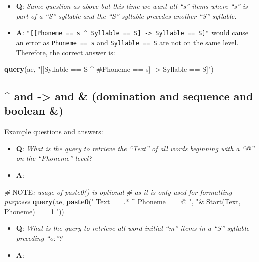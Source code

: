 \documentclass[]{book}
\newenvironment{Shaded}{\begin{snugshade}}{\end{snugshade}}
\newcommand{\AlertTok}[1]{\textcolor[rgb]{0.94,0.16,0.16}{#1}}
\newcommand{\CommentTok}[1]{\textcolor[rgb]{0.56,0.35,0.01}{\textit{#1}}}
\newcommand{\KeywordTok}[1]{\textcolor[rgb]{0.13,0.29,0.53}{\textbf{#1}}}
\newcommand{\NormalTok}[1]{#1}
\newcommand{\StringTok}[1]{\textcolor[rgb]{0.31,0.60,0.02}{#1}}
\providecommand{\tightlist}{%
  \setlength{\itemsep}{0pt}\setlength{\parskip}{0pt}}
\theoremstyle{definition}
\theoremstyle{definition}
\theoremstyle{definition}
\theoremstyle{remark}
\begin{document}
\begin{itemize}
\tightlist
\item
  \textbf{Q}: \emph{Same question as above but this time we want all
  ``s'' items where ``s'' is part of a ``S'' syllable and the ``S''
  syllable precedes another ``S'' syllable.}
\item
  \textbf{A}:
  \texttt{"{[}{[}Phoneme\ ==\ s\ \^{}\ Syllable\ ==\ S{]}\ -\textgreater{}\ Syllable\ ==\ S{]}"}
  would cause an error as \texttt{Phoneme\ ==\ s} and
  \texttt{Syllable\ ==\ S} are not on the same level. Therefore, the
  correct answer is:
\end{itemize}

\begin{Shaded}
\begin{Highlighting}[]
\KeywordTok{query}\NormalTok{(ae, }\StringTok{"[[Syllable == S ^ #Phoneme == s] -> Syllable == S]"}\NormalTok{)}
\end{Highlighting}
\end{Shaded}

\hypertarget{and---and-domination-and-sequence-and-boolean}{%
\subsection{\^{} and -\textgreater{} and \& (domination and sequence and
boolean \&)}\label{and---and-domination-and-sequence-and-boolean}}

Example questions and answers:

\begin{itemize}
\tightlist
\item
  \textbf{Q}: \emph{What is the query to retrieve the ``Text'' of all
  words beginning with a ``@'' on the ``Phoneme'' level?}
\item
  \textbf{A}:
\end{itemize}

\begin{Shaded}
\begin{Highlighting}[]
\CommentTok{# }\AlertTok{NOTE}\CommentTok{: usage of paste0() is optional}
\CommentTok{# as it is only used for formatting purposes}
\KeywordTok{query}\NormalTok{(ae, }\KeywordTok{paste0}\NormalTok{(}\StringTok{"[Text =~ .* ^ Phoneme == @ "}\NormalTok{,}
                 \StringTok{"& Start(Text, Phoneme) == 1]"}\NormalTok{))}
\end{Highlighting}
\end{Shaded}

\begin{itemize}
\tightlist
\item
  \textbf{Q}: \emph{What is the query to retrieve all word-initial ``m''
  items in a ``S'' syllable preceding ``o:''?}
\item
  \textbf{A}:
\end{itemize}
\end{document}

